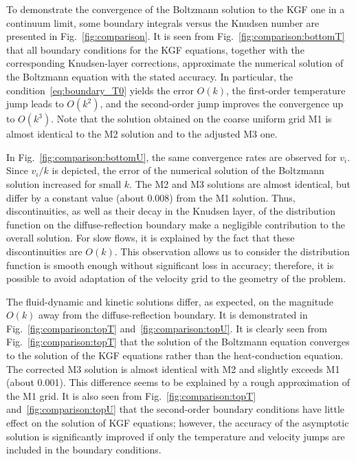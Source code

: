 \documentclass[10pt]{article}
\newcommand{\OO}[1]{O(#1)}
\begin{document}
To demonstrate the convergence of the Boltzmann solution to the KGF one in a continuum limit,
some boundary integrals versus the Knudsen number are presented in Fig.~\ref{fig:comparison}.
It is seen from Fig.~\ref{fig:comparison:bottomT} that all boundary conditions for the KGF equations,
together with the corresponding Knudsen-layer corrections,
approximate the numerical solution of the Boltzmann equation with the stated accuracy.
In particular, the condition~\eqref{eq:boundary_T0} yields the error \(\OO{k}\),
the first-order temperature jump leads to \(\OO{k^2}\),
and the second-order jump improves the convergence up to \(\OO{k^3}\).
Note that the solution obtained on the coarse uniform grid M1 is almost identical to the M2 solution
and to the adjusted M3 one.

In Fig.~\ref{fig:comparison:bottomU}, the same convergence rates are observed for \(v_i\).
Since \(v_i/k\) is depicted, the error of the numerical solution of the Boltzmann solution increased for small \(k\).
The M2 and M3 solutions are almost identical, but differ by a constant value (about \(0.008\)) from the M1 solution.
Thus, discontinuities, as well as their decay in the Knudsen layer, of the distribution function
on the diffuse-reflection boundary make a negligible contribution to the overall solution.
For slow flows, it is explained by the fact that these discontinuities are \(\OO{k}\).
This observation allows us to consider the distribution function is smooth enough without significant loss in accuracy;
therefore, it is possible to avoid adaptation of the velocity grid to the geometry of the problem.

The fluid-dynamic and kinetic solutions differ, as expected, on the magnitude \(\OO{k}\) away from the diffuse-reflection boundary.
It is demonstrated in Fig.~\ref{fig:comparison:topT} and~\ref{fig:comparison:topU}.
It is clearly seen from Fig.~\ref{fig:comparison:topT} that the solution of the Boltzmann equation
converges to the solution of the KGF equations rather than the heat-conduction equation.
The corrected M3 solution is almost identical with M2 and slightly exceeds M1 (about 0.001).
This difference seems to be explained by a rough approximation of the M1 grid.
It is also seen from Fig.~\ref{fig:comparison:topT} and~\ref{fig:comparison:topU} that the second-order boundary conditions
have little effect on the solution of KGF equations;
however, the accuracy of the asymptotic solution is significantly improved if only the temperature and velocity jumps
are included in the boundary conditions.
\end{document}
